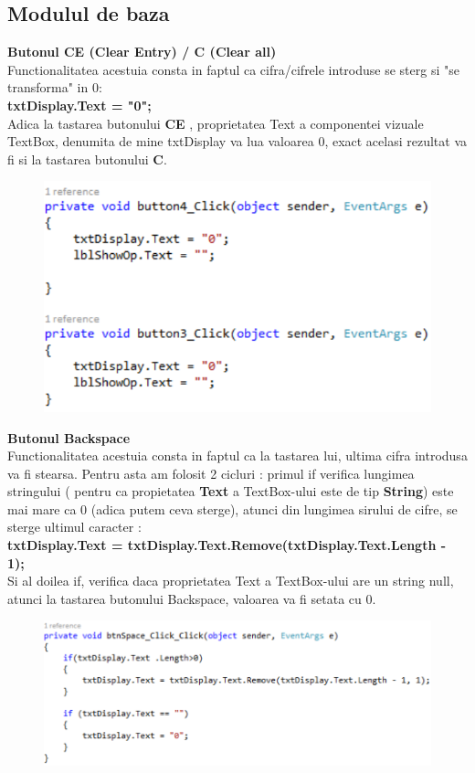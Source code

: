\subsection{Modulul de baza}
\textbf{ Butonul CE (Clear Entry) / C (Clear all)} \\
Functionalitatea acestuia consta in faptul ca cifra/cifrele introduse se sterg si "se transforma" in 0: \\
 \textbf{ txtDisplay.Text = "0";} \\
Adica la tastarea butonului \textbf{CE} , proprietatea Text a componentei vizuale TextBox, denumita de mine txtDisplay va lua valoarea 0, exact acelasi rezultat va fi si la tastarea 
butonului \textbf{C}. \\
\begin{figure}[h]
\centering
\includegraphics[scale=1]{1.pdf}
\end{figure}
\cleardoublepage
\textbf{Butonul Backspace} \\
Functionalitatea acestuia consta in faptul ca la tastarea lui, ultima cifra introdusa va fi stearsa. Pentru asta am folosit 2 cicluri : primul if verifica lungimea stringului ( pentru ca propietatea \textbf{Text} a TextBox-ului este de tip \textbf{String}) este mai mare ca 0 (adica putem ceva sterge), atunci din lungimea 
sirului de cifre, se sterge ultimul caracter : \\
\textbf{txtDisplay.Text = 
txtDisplay.Text.Remove(txtDisplay.Text.Length - 1);}\\
Si al doilea if, verifica daca proprietatea Text a TextBox-ului are un string null, atunci la tastarea butonului Backspace, valoarea va fi setata cu 0.\\
\begin{figure}[h]
\centering
\includegraphics[scale=1]{2.pdf}
\end{figure}
\cleardoublepage

